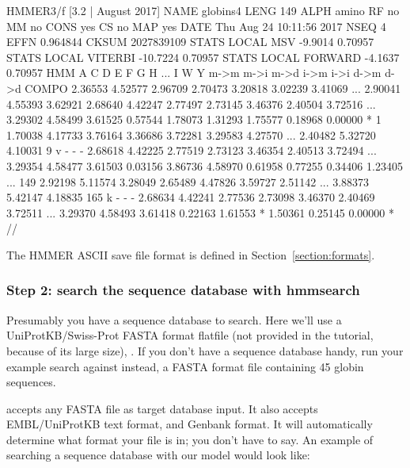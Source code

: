 \begin{samepage}
\begin{sreoutput}
HMMER3/f [3.2 | August 2017]
NAME  globins4
LENG  149
ALPH  amino
RF    no
MM    no
CONS  yes
CS    no
MAP   yes
DATE  Thu Aug 24 10:11:56 2017
NSEQ  4
EFFN  0.964844
CKSUM 2027839109
STATS LOCAL MSV       -9.9014  0.70957
STATS LOCAL VITERBI  -10.7224  0.70957
STATS LOCAL FORWARD   -4.1637  0.70957
HMM          A        C        D        E        F        G        H     ...     I        W        Y   
            m->m     m->i     m->d     i->m     i->i     d->m     d->d
  COMPO   2.36553  4.52577  2.96709  2.70473  3.20818  3.02239  3.41069  ...  2.90041 4.55393  3.62921
          2.68640  4.42247  2.77497  2.73145  3.46376  2.40504  3.72516  ...  3.29302 4.58499  3.61525
          0.57544  1.78073  1.31293  1.75577  0.18968  0.00000        *
      1   1.70038  4.17733  3.76164  3.36686  3.72281  3.29583  4.27570  ...  2.40482 5.32720  4.10031      9 v - - -
          2.68618  4.42225  2.77519  2.73123  3.46354  2.40513  3.72494  ...  3.29354 4.58477  3.61503
          0.03156  3.86736  4.58970  0.61958  0.77255  0.34406  1.23405 
...
    149   2.92198  5.11574  3.28049  2.65489  4.47826  3.59727  2.51142  ...  3.88373 5.42147  4.18835    165 k - - -
          2.68634  4.42241  2.77536  2.73098  3.46370  2.40469  3.72511  ...  3.29370 4.58493  3.61418
          0.22163  1.61553        *  1.50361  0.25145  0.00000        *
//
\end{sreoutput}
\end{samepage}

The HMMER ASCII save file format is defined in
Section~\ref{section:formats}.



\subsubsection{Step 2: search the sequence database with hmmsearch}

Presumably you have a sequence database to search. Here we'll use a
UniProtKB/Swiss-Prot FASTA format flatfile (not provided in the
tutorial, because of its large size), .  If
you don't have a sequence database handy, run your example search
against  instead, a FASTA format file
containing 45 globin sequences.

 accepts any FASTA file as target database input. It
also accepts EMBL/UniProtKB text format, and Genbank format. It will
automatically determine what format your file is in; you don't have to
say. An example of searching a sequence database with our
 model would look like:

